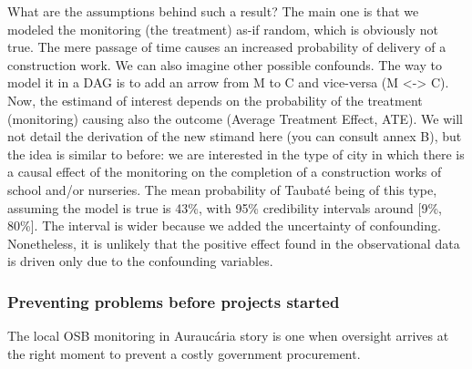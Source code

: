 \documentclass[]{AEA}
\begin{document}
What are the assumptions behind such a result? The main one is that we
modeled the monitoring (the treatment) as-if random, which is obviously
not true. The mere passage of time causes an increased probability of
delivery of a construction work. We can also imagine other possible
confounds. The way to model it in a DAG is to add an arrow from M to C
and vice-versa (M \textless-\textgreater{} C). Now, the estimand of
interest depends on the probability of the treatment (monitoring)
causing also the outcome (Average Treatment Effect, ATE). We will not
detail the derivation of the new stimand here (you can consult annex B),
but the idea is similar to before: we are interested in the type of city
in which there is a causal effect of the monitoring on the completion of
a construction works of school and/or nurseries. The mean probability of
Taubaté being of this type, assuming the model is true is 43\%, with
95\% credibility intervals around {[}9\%, 80\%{]}. The interval is wider
because we added the uncertainty of confounding. Nonetheless, it is
unlikely that the positive effect found in the observational data is
driven only due to the confounding variables.

\hypertarget{preventing-problems-before-projects-started}{%
\subsubsection{Preventing problems before projects
started}\label{preventing-problems-before-projects-started}}

The local OSB monitoring in Auraucária story is one when oversight
arrives at the right moment to prevent a costly government procurement.
\end{document}
